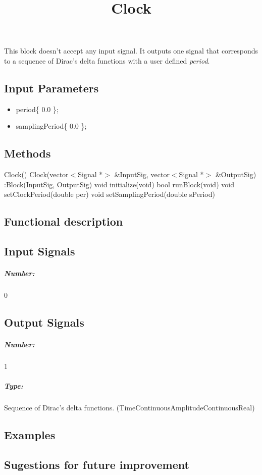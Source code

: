 \documentclass[a4paper]{article}
\title{Clock}
\begin{document}
\maketitle

This block doesn't accept any input signal. It outputs one signal that corresponds to a sequence of Dirac's delta functions with a user defined \textit{period}.

\subsection*{Input Parameters}

\begin{itemize}
	\item period\{ 0.0 \};
	\item samplingPeriod\{ 0.0 \};
\end{itemize}

\subsection*{Methods}
 
Clock() {}
\bigbreak
Clock(vector$<$Signal *$>$ \&InputSig, vector$<$Signal *$>$ \&OutputSig) :Block(InputSig, OutputSig) {}
\bigbreak
void initialize(void)
\bigbreak
bool runBlock(void)
\bigbreak
void setClockPeriod(double per)
\bigbreak
void setSamplingPeriod(double sPeriod)
\subsection*{Functional description}


\pagebreak

\subsection*{Input Signals}

\subparagraph*{Number:} 0

\subsection*{Output Signals}

\subparagraph*{Number:} 1

\subparagraph*{Type:} Sequence of Dirac's delta functions. (TimeContinuousAmplitudeContinuousReal)

\subsection*{Examples} 

\subsection*{Sugestions for future improvement}
\end{document}
